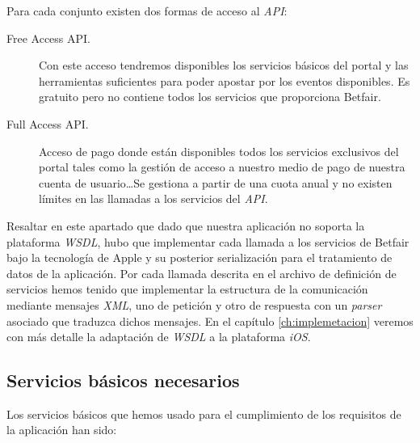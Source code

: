   Para cada conjunto existen dos formas de acceso al \emph{API}:
\begin{description}
	\item [Free Access API.]  Con este acceso tendremos disponibles los servicios básicos del portal y las herramientas suficientes para poder apostar por los eventos disponibles. Es gratuito pero no contiene todos los servicios que proporciona Betfair.
	\item [Full Access API.] Acceso de pago donde están disponibles todos los servicios exclusivos del portal tales como la gestión de acceso a nuestro medio de pago de nuestra cuenta de usuario\ldots Se gestiona a partir de una cuota anual y no existen límites en las llamadas a los servicios del \emph{API}.
\end{description}

Resaltar en este apartado que dado que nuestra aplicación no soporta la plataforma \emph{WSDL}, hubo que implementar cada llamada a los servicios de Betfair bajo la tecnología de Apple y su posterior serialización para el tratamiento de datos de la aplicación. Por cada llamada descrita en el archivo de definición de servicios hemos tenido que implementar la estructura de la comunicación mediante mensajes \emph{XML}, uno de petición y otro de respuesta con un \emph{parser} asociado que traduzca dichos mensajes. En el capítulo \ref{ch:implemetacion} veremos con más detalle la adaptación de \emph{WSDL} a la plataforma \emph{iOS}.

\subsection{Servicios básicos necesarios}

    Los servicios básicos que hemos usado para el cumplimiento de los requisitos de la aplicación han sido:

